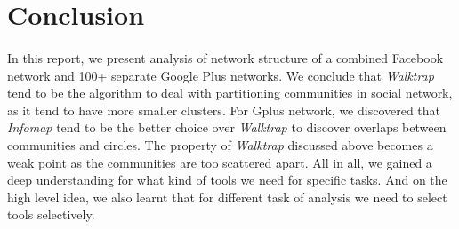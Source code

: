 \section*{Conclusion}
\paragraph{}
In this report, we present analysis of network structure of a combined Facebook network and 100+ separate Google Plus networks. We conclude that \textit{Walktrap} tend to be the algorithm to deal with partitioning communities in social network, as it tend to have more smaller clusters. For Gplus network, we discovered that \textit{Infomap} tend to be the better choice over \textit{Walktrap} to discover overlaps between communities and circles. The property of \textit{Walktrap} discussed above becomes a weak point as the communities are too scattered apart. All in all, we gained a deep understanding for what kind of tools we need for specific tasks. And on the high level idea, we also learnt that for different task of analysis we need to select tools selectively.
